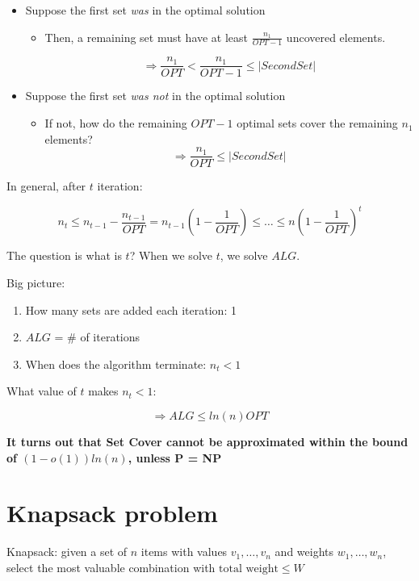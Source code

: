 \documentclass[11pt]{article}
\begin{document}
\begin{itemize}
\item Suppose the first set \emph{was} in the optimal solution
\begin{itemize}
\item Then, a remaining set must have at least \(\frac{n_1}{OPT-1}\) uncovered elements.

\[ \Longrightarrow \frac{n_1}{OPT} < \frac{n_1}{OPT -1} \leq |Second Set| \]
\end{itemize}

\item Suppose the first set \emph{was not} in the optimal solution
\begin{itemize}
\item If not, how do the remaining \(OPT -1\) optimal sets cover the remaining \(n_1\) elements?
\[ \Longrightarrow \frac{n_1}{OPT} \leq |Second Set| \]
\end{itemize}
\end{itemize}


In general, after \(t\) iteration:

\[ n_t \leq n_{t-1} - \frac{n_{t-1}}{OPT} = n_{t-1} \left(1 - \frac{1}{OPT}\right) \leq \ldots \leq n\left(1 - \frac{1}{OPT}\right)^t \]

The question is what is \(t\)? When we solve \(t\), we solve \(ALG\).

Big picture:
\begin{enumerate}
\item How many sets are added each iteration: 1
\item \(ALG\) = \# of iterations
\item When does the algorithm terminate: \(n_t < 1\)
\end{enumerate}

What value of \(t\) makes \(n_t < 1\):

\[ \Longrightarrow ALG \leq ln(n) OPT \]

\textbf{\textbf{It turns out that Set Cover cannot be approximated within the bound of \((1- o(1)) ln(n)\), unless P = NP}}

\section{Knapsack problem}
\label{sec:orgab2da6b}

Knapsack: given a set of \(n\) items with values \(v_1, \ldots, v_n\) and weights \(w_1, \ldots, w_n\), select the most valuable combination with \(\text{total weight} \leq W\)
\end{document}
